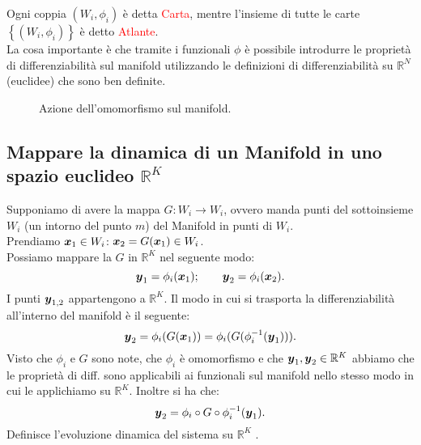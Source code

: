 \noindent
Ogni coppia $(W_i, \phi_i)$ è detta \textcolor{red}{Carta}, mentre l'insieme di tutte le carte $\left\{(W_i, \phi_i) \right\}$ è detto \textcolor{red}{Atlante}.\\
La cosa importante è che tramite i funzionali $\phi$ è possibile introdurre le proprietà di differenziabilità sul manifold utilizzando le definizioni di differenziabilità su $\mathbb{R}^N$ (euclidee) che sono ben definite.
\begin{figure}[H]
    \centering
    \caption{\scriptsize Azione dell'omomorfismo sul manifold.}
    \label{fig:3_2}
\end{figure}
\subsection{Mappare la dinamica di un Manifold in uno spazio euclideo $\mathbb{R}^K$}%
\label{sub:Mappare la dinamica di un Manifold in Rn }
Supponiamo di avere la mappa $G: W_i\to W_i$, ovvero manda punti del sottoinsieme $W_i$ (un intorno del punto $m$) del Manifold in punti di $W_i$.\\
Prendiamo $\boldsymbol{x}_1 \in W_i$: $\boldsymbol{x}_2 = G(\boldsymbol{x}_1)\in W_i$.\\
Possiamo mappare la $G$ in $\mathbb{R}^K$ nel seguente modo:
\[
    \boldsymbol{y}_1 = \phi_i(\boldsymbol{x}_1); \qquad \boldsymbol{y}_2 = \phi_i(\boldsymbol{x}_2)
.\] 
I punti $\boldsymbol{y}_{1,2}$ appartengono a $\mathbb{R}^K$. Il modo in cui si trasporta la differenziabilità all'interno del manifold è il seguente:
\[
    \boldsymbol{y}_2 = \phi_i(G(\boldsymbol{x}_1)) = \phi_i(G(\phi_i^{-1}(\boldsymbol{y}_1)))
.\] 
Visto che $\phi_i$ e $G$ sono note, che $\phi_i$ è omomorfismo e che $\boldsymbol{y}_1, \boldsymbol{y}_2 \in \mathbb{R}^K$ abbiamo che le proprietà di diff. sono applicabili ai funzionali sul manifold nello stesso modo in cui le applichiamo su $\mathbb{R}^K$. Inoltre si ha che:
\[
    \boldsymbol{y}_2 = \phi_i \circ G \circ \phi_i^{-1}(\boldsymbol{y}_1) 
.\] 
Definisce l'evoluzione dinamica del sistema su $\mathbb{R}^K$ .
